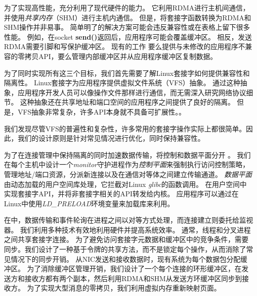 为了实现高性能，\sys{}充分利用了现代硬件的能力。 它利用RDMA进行主机间通信，并使用\emph {共享内存}（SHM）进行主机内通信。 但是，将套接字函数转换为RDMA和SHM操作并非易事。 简单明了的解决方案可能会违反兼容性或在表格上留下很多性能。 例如，在socket \textbf {send()}返回后，应用程序可能会覆盖缓冲区。 相反，发送RDMA需要引脚和写保护缓冲区。 现有的工作 \cite {rsockets}要么提供与未修改的应用程序不兼容的零拷贝API，要么管理内部缓冲区并从应用程序缓冲区复制数据。

为了同时实现所有这三个目标，我们首先需要了解Linux套接字如何提供兼容性和隔离性。 Linux套接字为应用程序提供虚拟文件系统（VFS）抽象。 通过这种抽象，应用程序开发人员可以像操作文件那样进行通信，而无需深入研究网络协议细节。 这种抽象还在共享地址和端口空间的应用程序之间提供了良好的隔离。 但是，VFS抽象非常复杂，许多API本身就不具备可扩展性。\cite {clark1989analysis,boyd2010analysis,jeong2014mtcp}。

我们发现尽管VFS的普遍性和复杂性，许多常用的套接字操作实际上都很简单。因此，我们的设计原则是针对常见情况进行优化，同时保持兼容性。

为了在连接管理中保持隔离的同时加速数据传输，\sys {}将控制和数据平面分开 \cite {peter2016arrakis}。
我们在每个主机中设计一个\emph {monitor}守护进程作为\emph {控制平面}来强制执行访问控制策略，管理地址/端口资源，分派新连接以及在通信对等体之间建立传输通道。
\emph {数据平面}由动态加载的用户空间库\libipc {}处理，它拦截对Linux \emph {glibc}的函数调用。 \libipc {}在用户空间中实现套接字API，并将非套接字相关的API转发给内核。
应用程序可以通过在Linux中使用\emph {LD\_PRELOAD}环境变量来加载库来利用\libipc {}。


在\sys {}中，数据传输和事件轮询在进程之间以对等方式处理，而连接建立则委托给监视器。
我们利用多种技术有效地利用硬件并提高系统效率。
通常，线程和分叉进程之间共享套接字连接。
为了避免访问套接字元数据和缓冲区中的竞争条件，需要同步。我们设计了一种基于令牌的共享方法，而不是锁定每个操作，从而消除了常见情况下的同步开销。
从NIC发送和接收数据时，现有系统为每个数据包分配缓冲区。
为了消除缓冲区管理开销，我们设计了一个每个连接的环形缓冲区，在发送方和接收方都有两个副本，然后利用RDMA和SHM从发送方环缓冲区同步到接收方。
为了实现大型消息的零拷贝，我们利用虚拟内存重新映射页面。

